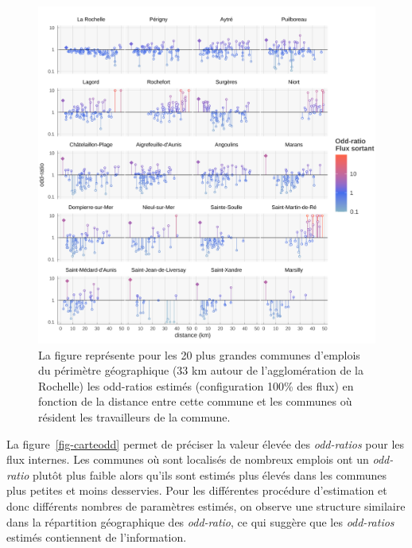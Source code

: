 \documentclass[
  10pt,
  a4paper,
  numbers=noendperiod,
  DIV=9]{scrreprt}
\begin{document}
\begin{figure}[htb]

{\centering \includegraphics[width=1\textwidth,height=\textheight]{./output/spectre effectif par DCLT 100.png}

}

\caption[Odd-ratio par commune d'emploi fonction de la distance aux
communes de résidence (spectre emplois)]{\label{fig-spectreE}La figure
représente pour les 20 plus grandes communes d'emplois du périmètre
géographique (33 km autour de l'agglomération de la Rochelle) les
odd-ratios estimés (configuration 100\% des flux) en fonction de la
distance entre cette commune et les communes où résident les
travailleurs de la commune.}

\end{figure}

La figure~\ref{fig-carteodd} permet de préciser la valeur élevée des
\emph{odd-ratios} pour les flux internes. Les communes où sont localisés
de nombreux emplois ont un \emph{odd-ratio} plutôt plus faible alors
qu'ils sont estimés plus élevés dans les communes plus petites et moins
desservies. Pour les différentes procédure d'estimation et donc
différents nombres de paramètres estimés, on observe une structure
similaire dans la répartition géographique des \emph{odd-ratio}, ce qui
suggère que les \emph{odd-ratios} estimés contiennent de l'information.
\end{document}
